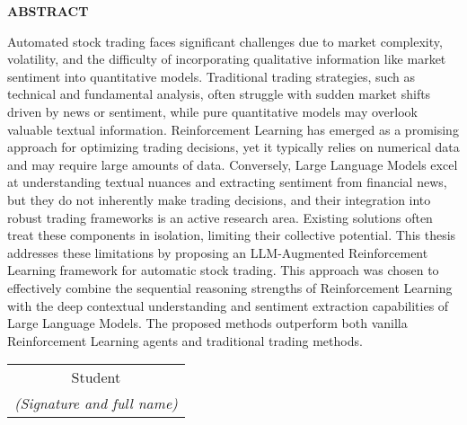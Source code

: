 \begin{center}
    \Large{\textbf{ABSTRACT}}\\
\end{center}
\vspace{1cm}
Automated stock trading faces significant challenges due to market complexity, volatility, and the difficulty of incorporating qualitative information like market sentiment into quantitative models. Traditional trading strategies, such as technical and fundamental analysis, often struggle with sudden market shifts driven by news or sentiment, while pure quantitative models may overlook valuable textual information. Reinforcement Learning has emerged as a promising approach for optimizing trading decisions, yet it typically relies on numerical data and may require large amounts of data. Conversely, Large Language Models excel at understanding textual nuances and extracting sentiment from financial news, but they do not inherently make trading decisions, and their integration into robust trading frameworks is an active research area. Existing solutions often treat these components in isolation, limiting their collective potential. This thesis addresses these limitations by proposing an LLM-Augmented Reinforcement Learning framework for automatic stock trading. This approach was chosen to effectively combine the sequential reasoning strengths of Reinforcement Learning with the deep contextual understanding and sentiment extraction capabilities of Large Language Models. The proposed methods outperform both vanilla Reinforcement Learning agents and traditional trading methods.
\begin{flushright}
\begin{tabular}{@{}c@{}}
Student\\
\textit{(Signature and full name)}
\end{tabular}
\end{flushright}
